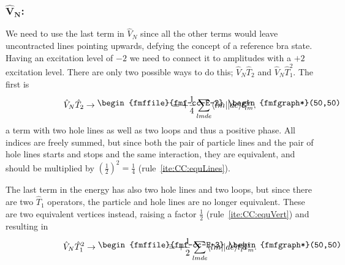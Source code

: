 \subsubsection{$\mathbf{\hat{V}_N}$:}
We need to use the last term in $\hat{V}_N$ since all the other terms would leave uncontracted lines pointing upwards, defying the concept of a reference bra state.
Having an excitation level of $-2$ we need to connect it to amplitudes with a $+2$ excitation level.
There are only two possible ways to do this; $\hat{V}_N \hat{T}_2$ and $\hat{V}_N \hat{T}_1^2$.
The first is
\begin{equation}
\hat{V}_N \hat{T}_2
\rightarrow
\parbox{30mm}{
    \textrm{
    \begin{fmffile}{fmf-cc-E-2}
    \begin{fmfgraph*}(50,50)
        \fmfstraight
        \fmfbottom{b1,b2}
        \fmftop{t1,t2}
        \fmf{plain}{b1,b2}
        \fmf{dashes}{t1,t2}
        \fmf{electron,right=0.4}{b1,t1}
        \fmf{electron,right=0.4}{t1,b1}
        \fmf{electron,right=0.4}{b2,t2}
        \fmf{electron,right=0.4}{t2,b2}
    \end{fmfgraph*}
    \end{fmffile}
    }
}
= + \frac{1}{4} \sum_{lmde} \langle lm|| de \rangle t_{lm}^{de}, 
\end{equation}
a term with two hole lines as well as two loops and thus a positive phase.
All indices are freely summed, but since both the pair of particle lines and the pair of hole lines starts and stops and the same interaction, they are equivalent, and should be multiplied by $\left(\frac{1}{2}\right)^2 = \frac{1}{4}$ (rule~\ref{ite:CC:equLines}).

The last term in the energy has also two hole lines and two loops, but since there are two $\hat{T}_1$ operators, the particle and hole lines are no longer equivalent.
These are two equivalent vertices instead, raising a factor $\frac{1}{2}$ (rule~\ref{ite:CC:equVert}) and resulting in 
\begin{equation}
\hat{V}_N \hat{T}_1^2
\rightarrow
\parbox{28mm}{
    \textrm{
    \begin{fmffile}{fmf-cc-E-3}
        \begin{fmfgraph*}(50,50)
            \fmfstraight
            \fmfbottom{b1,b2,b3,b4}
            \fmftop{t1,t2}
            \fmf{plain}{b1,elBotL,b2}
            \fmf{plain}{b3,elBotR,b4}
            \fmf{phantom,tension=4}{t1,elTopL}
            \fmf{phantom,tension=4}{elTopR,t2}
            \fmf{dashes}{elTopL,elTopR}
            \fmffreeze
            \fmf{electron,right=0.4}{elBotL,elTopL}
            \fmf{electron,right=0.4}{elTopL,elBotL}
            \fmf{electron,right=0.4}{elBotR,elTopR}
            \fmf{electron,right=0.4}{elTopR,elBotR}
        \end{fmfgraph*}
    \end{fmffile}
    }
}
= +\frac{1}{2} \sum_{lmde} \langle lm||de \rangle t_l^d t_m^e .
\end{equation}

